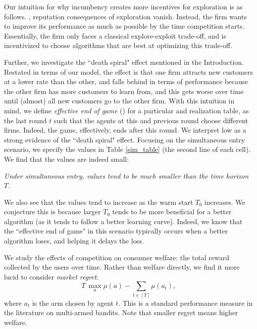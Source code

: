\documentclass[../competing_bandits_with_appendix.tex]{subfiles}
\begin{document}
Our intuition for why incumbency creates more incentives for exploration is as follows. , reputation consequences of exploration vanish. Instead, the firm wants to improve its performance as much as possible by the time competition starts. Essentially, the firm only faces a classical explore-exploit trade-off, and is incentivized to choose algorithms that are best at optimizing this trade-off.

Further, we investigate the ``death spiral" effect mentioned in the Introduction. Restated in terms of our model, the effect is that one firm attracts new customers at a lower rate than the other, and falls behind in terms of performance because the other firm has more customers to learn from, and this gets worse over time until (almost) all new customers go to the other firm. With this intuition in mind, we define  \textit{effective end of game} (\Eeog) for a particular \MRV and realization table, as the last round $t$ such that the agents at this and previous round choose different firms. Indeed, the game, effectively, ends after this round. We interpret low \Eeog as a strong evidence of the ``death spiral" effect. Focusing on the simultaneous entry scenario, we specify the \Eeog values in Table \ref{sim_table} (the second line of each cell). We find that the \Eeog values are indeed small:

\begin{finding}
\textit{
Under simultaneous entry, \Eeog values tend to be much smaller than the time horizon $T$.
}
\end{finding}

We also see that the \Eeog values tend to increase as the warm start $T_0$ increases. We conjecture this is because larger $T_0$ tends to be more beneficial for a better algorithm (as it tends to follow a better learning curve). Indeed, we know that the ``effective end of game" in this scenario typically occurs when a better algorithm loses, and helping it delays the loss.


We study the effects of competition on consumer welfare: the total reward collected by the users over time. Rather than welfare directly, we find it more lucid to consider
\emph{market regret}:
\[ \textstyle T\, \max_a \mu(a) - \sum_{t\in [T]} \mu(a_t), \]
where $a_t$ is the arm chosen by agent $t$. This is a standard performance measure in the literature on multi-armed bandits. Note that smaller regret means higher welfare.
\end{document}

